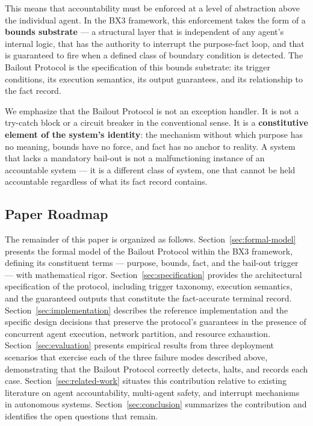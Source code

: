 This means that accountability must be enforced at a level of abstraction above the individual agent. In the BX3 framework, this enforcement takes the form of a \textbf{bounds substrate} --- a structural layer that is independent of any agent's internal logic, that has the authority to interrupt the purpose-fact loop, and that is guaranteed to fire when a defined class of boundary condition is detected. The Bailout Protocol is the specification of this bounds substrate: its trigger conditions, its execution semantics, its output guarantees, and its relationship to the fact record.

We emphasize that the Bailout Protocol is not an exception handler. It is not a try-catch block or a circuit breaker in the conventional sense. It is a \textbf{constitutive element of the system's identity}: the mechanism without which purpose has no meaning, bounds have no force, and fact has no anchor to reality. A system that lacks a mandatory bail-out is not a malfunctioning instance of an accountable system --- it is a different class of system, one that cannot be held accountable regardless of what its fact record contains.

\subsection{Paper Roadmap}

The remainder of this paper is organized as follows. Section~\ref{sec:formal-model} presents the formal model of the Bailout Protocol within the BX3 framework, defining its constituent terms --- purpose, bounds, fact, and the bail-out trigger --- with mathematical rigor. Section~\ref{sec:specification} provides the architectural specification of the protocol, including trigger taxonomy, execution semantics, and the guaranteed outputs that constitute the fact-accurate terminal record. Section~\ref{sec:implementation} describes the reference implementation and the specific design decisions that preserve the protocol's guarantees in the presence of concurrent agent execution, network partition, and resource exhaustion. Section~\ref{sec:evaluation} presents empirical results from three deployment scenarios that exercise each of the three failure modes described above, demonstrating that the Bailout Protocol correctly detects, halts, and records each case. Section~\ref{sec:related-work} situates this contribution relative to existing literature on agent accountability, multi-agent safety, and interrupt mechanisms in autonomous systems. Section~\ref{sec:conclusion} summarizes the contribution and identifies the open questions that remain.
